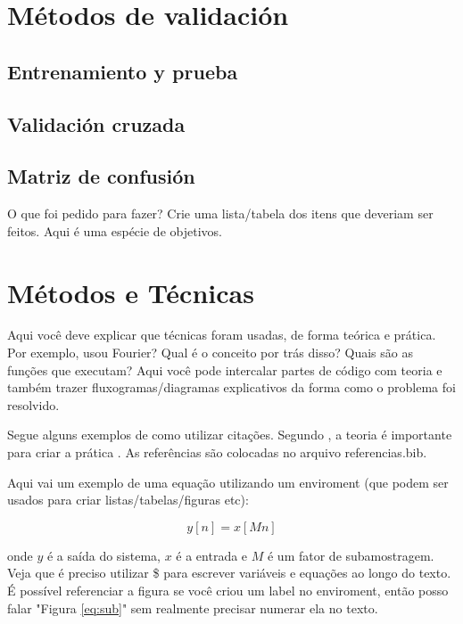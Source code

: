 \documentclass[12pt,a4paper, brazil]{article}
\begin{document}
\section{Métodos de validación}
    \subsection{Entrenamiento y prueba}
    \subsection{Validación cruzada}
    \subsection{Matriz de confusión}

O que foi pedido para fazer? Crie uma lista/tabela dos itens que deveriam ser feitos. Aqui é uma espécie de objetivos.

\section{Métodos e Técnicas}

Aqui você deve explicar que técnicas foram usadas, de forma teórica e prática. Por exemplo, usou Fourier? Qual é o conceito por trás disso? Quais são as funções que executam? Aqui você pode intercalar partes de código com teoria e também trazer fluxogramas/diagramas explicativos da forma como o problema foi resolvido. 

Segue alguns exemplos de como utilizar citações. Segundo \textcite{citacao-exemplo}, a teoria é importante para criar a prática \cite{citacao-exemplo}. As referências são colocadas no arquivo referencias.bib. 

\par
Aqui vai um exemplo de uma equação utilizando um enviroment (que podem ser usados para criar listas/tabelas/figuras etc): 

\begin{equation}
\label{eq:sub}
y[n] = x[Mn]
\end{equation}

onde $y$ é a saída do sistema, $x$ é a entrada e $M$ é um fator de subamostragem. Veja que é preciso utilizar \$ para escrever variáveis e equações ao longo do texto. É possível referenciar a figura se você criou um label no enviroment, então posso falar "Figura \ref{eq:sub}" sem realmente precisar numerar ela no texto. 
\end{document}
